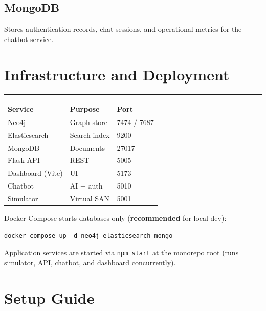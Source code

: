 \documentclass[11pt,a4paper]{article}
\begin{document}
\subsection{MongoDB}

Stores authentication records, chat sessions, and operational metrics for the chatbot service.


\section{Infrastructure and Deployment}

\vspace{0.3cm}\hrule\vspace{0.6cm}

\begin{longtable}{p{4.5cm} p{4.5cm} p{3cm}}
\toprule
\rowcolor{headerbg}
\textbf{Service} & \textbf{Purpose} & \textbf{Port} \\
\midrule
Neo4j & Graph store & 7474 / 7687 \\
Elasticsearch & Search index & 9200 \\
MongoDB & Documents & 27017 \\
Flask API & REST & 5005 \\
Dashboard (Vite) & UI & 5173 \\
Chatbot & AI + auth & 5010 \\
Simulator & Virtual SAN & 5001 \\
\bottomrule
\end{longtable}

Docker Compose starts databases only (\textbf{recommended} for local dev):

\begin{lstlisting}
docker-compose up -d neo4j elasticsearch mongo
\end{lstlisting}

Application services are started via \texttt{npm start} at the monorepo root (runs simulator, API, chatbot, and dashboard concurrently).


\section{Setup Guide}
\end{document}
